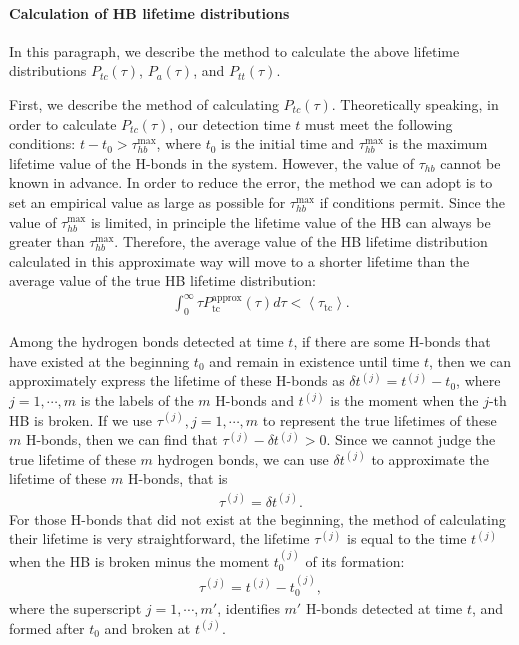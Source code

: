 \paragraph{Calculation of HB lifetime distributions}
In this paragraph, we describe the method to calculate the above lifetime distributions $P_{tc}(\tau)$, $P_{a}(\tau)$, and $P_{tt}(\tau)$.

First, we describe the method of calculating $P_{tc}(\tau)$.
Theoretically speaking, in order to calculate $P_{tc}(\tau)$, our detection time $t$ must meet the following conditions: 
$t-t_0 > \tau_{hb}^{\max}$, where $t_0$ is the initial time and $\tau_{hb}^{\max}$ is the maximum lifetime value of the H-bonds in the system. 
However, the value of $\tau_{hb}$ cannot be known in advance. 
In order to reduce the error, the method we can adopt is to set an empirical value as large as possible for
 $\tau_{hb}^{\max}$ if conditions permit. Since the value of $\tau_{hb}^{\max}$ is limited, in principle the lifetime value of the HB 
can always be greater than $\tau_{hb}^{\max}$. 
Therefore, the average value of the HB lifetime distribution 
calculated in this approximate way will move to a shorter lifetime than the average value of the true HB lifetime distribution:
\begin{eqnarray}
\int_{0}^{\infty} \tau P_{\mathrm{tc}}^{\mathrm{approx}}(\tau) d \tau < \left\langle\tau_{\mathrm{tc}}\right\rangle.
\label{eq:upper_bound_1_for_tau_tc}
\end{eqnarray} 

Among the hydrogen bonds detected at time $t$, if there are some H-bonds that have existed at the beginning $t_0$ and 
remain in existence until time $t$, then we can approximately express the lifetime of these H-bonds as $\delta t^{(j)}=t^{(j)} -t_0$, 
where $j=1,\cdots, m$ is the labels of the $m$ H-bonds and $t^{(j)}$ is the moment when the $j$-th HB is broken. 
If we use $\tau^{(j)},j=1,\cdots,m$ to represent the true lifetimes of these $m$ H-bonds,
then we can find that $\tau^{(j)}-\delta t^{(j)} >0 $.
Since we cannot judge the true lifetime of these $m$ hydrogen bonds, we can use $\delta t^{(j)}$ to approximate 
the lifetime of these $m$ H-bonds, that is
\begin{eqnarray}
\tau^{(j)} = \delta t^{(j)}.
\end{eqnarray}
For those H-bonds that did not exist at the beginning, the method of calculating their lifetime is very straightforward, 
the lifetime $\tau^{(j)}$ is equal to the time $t^{(j)}$ when the HB is broken minus the moment $t^{{(j)}}_0$ of its formation:
\begin{eqnarray}
\tau^{(j)} = t^{(j)} - t^{(j)}_0,
\end{eqnarray} 
where the superscript $j = 1, \cdots, m'$, identifies $m'$ H-bonds 
detected at time $t$, and
formed after $t_0$ and broken at $t^{(j)}$.

